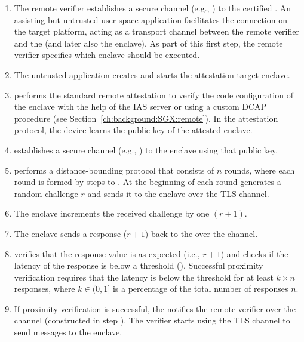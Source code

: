 \begin{enumerate}%
 
  \item[\one] The remote verifier establishes a secure channel (e.g., \tls) to the certified \device. An assisting but untrusted user-space application facilitates the connection on the target platform, acting as a transport channel between the remote verifier and the \device (and later also the enclave). As part of this first step, the remote verifier specifies which enclave should be executed.%

  \item[\two] The untrusted application creates and starts the attestation target enclave.%

  \item[\three] \device performs the standard remote attestation to verify the code configuration of the enclave with the help of the IAS server or using a custom DCAP procedure (see Section~\ref{ch:background:SGX:remote}). In the attestation protocol, the device learns the public key of the attested enclave.%

  \item[\four] \device establishes a secure channel (e.g., \tls) to the enclave using that public key.

  \item[\five] \device performs a distance-bounding protocol that consists of $n$ rounds, where each round is formed by steps \five to \eight.
  At the beginning of each round \device generates a random challenge $r$ and sends it to the enclave over the TLS channel.

  \item[\six] The enclave increments the received challenge by one $(r+1)$.

  \item[\seven] The enclave sends a response ($r+1$) back to the \device over the \tls channel.

  \item[\eight] \device verifies that the response value is as expected (i.e., $r+1$) and checks if the latency of the response is below a threshold (\connect). Successful proximity verification requires that the latency is below the threshold for at least $k \times n$ responses, where $k \in (0, 1]$ is a percentage of the total number of responses $n$.

  \item[\nine] If proximity verification is successful, the \device notifies the remote verifier over the \tls channel (constructed in step \one). The verifier starts using the \device TLS channel to send messages to the enclave.
\end{enumerate}


